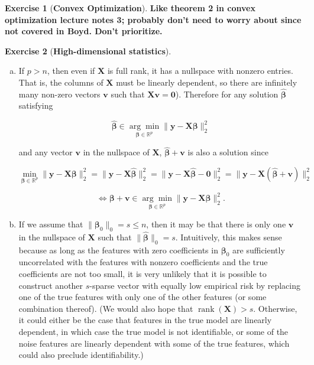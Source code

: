 \documentclass{article}
\theoremstyle{definition}
\newtheorem{exercise}{Exercise}
\theoremstyle{definition}
\theoremstyle{definition}
\theoremstyle{definition}
\begin{document}
\begin{exercise}[\textbf{Convex Optimization}]

\textbf{Like theorem 2 in convex optimization lecture notes 3; probably don't need to worry about since not covered in Boyd. Don't prioritize.}

\end{exercise}

\begin{exercise}[\textbf{High-dimensional statistics}]

\begin{enumerate}[(a)]

\item If \(p > n\), then even if \(\boldsymbol{X}\) is full rank, it has a nullspace with nonzero entries. That is, the columns of \(\boldsymbol{X}\) must be linearly dependent, so there are infinitely many non-zero vectors \(\boldsymbol{v}\) such that \(\boldsymbol{X}\boldsymbol{v} = \boldsymbol{0}\)). Therefore for any solution \(\hat{\boldsymbol{\beta}}\) satisfying 

\[
\hat{\boldsymbol{\beta}} \in \underset{\boldsymbol{\beta} \in \mathbb{R}^p}{\arg \min} \lVert \boldsymbol{y} - \boldsymbol{X} \boldsymbol{\beta} \rVert_2^2 
\]

and any vector \(\boldsymbol{v}\) in the nullspace of \(\boldsymbol{X}\), \(\hat{\boldsymbol{\beta}} + \boldsymbol{v}\) is also a solution since

\[
 \underset{\boldsymbol{\beta} \in \mathbb{R}^p}{\min} \lVert \boldsymbol{y} - \boldsymbol{X} \boldsymbol{\beta} \rVert_2^2 =  \lVert \boldsymbol{y} - \boldsymbol{X} \hat{\boldsymbol{\beta}} \rVert_2^2  =  \lVert \boldsymbol{y} - \boldsymbol{X} \hat{\boldsymbol{\beta}} - \boldsymbol{0} \rVert_2^2  =  \lVert \boldsymbol{y} - \boldsymbol{X} (\hat{\boldsymbol{\beta}} + \boldsymbol{v}) \rVert_2^2 
 \]
 
 \[
 \iff \boldsymbol{\beta} + \boldsymbol{v} \in \underset{\boldsymbol{\beta} \in \mathbb{R}^p}{\arg \min} \lVert \boldsymbol{y} - \boldsymbol{X} \boldsymbol{\beta} \rVert_2^2 .
\]

\item If we assume that \( \lVert \boldsymbol{\beta}_0 \rVert_0 = s \leq n\), then it may be that there is only one \(\boldsymbol{v}\) in the nullspace of \(\boldsymbol{X}\) such that \(\lVert \hat{\boldsymbol{\beta}}\rVert_0 = s\). Intuitively, this makes sense because as long as the features with zero coefficients in \(\boldsymbol{\beta}_0\) are sufficiently uncorrelated with the features with nonzero coefficients and the true coefficients are not too small, it is very unlikely that it is possible to construct another \(s\)-sparse vector with equally low empirical risk by replacing one of the true features with only one of the other features (or some combination thereof). (We would also hope that \(\operatorname{rank}(\boldsymbol{X}) > s\). Otherwise, it could either be the case that features in the true model are linearly dependent, in which case the true model is not identifiable, or some of the noise features are linearly dependent with some of the true features, which could also preclude identifiability.)


\end{enumerate}
\end{exercise}
\end{document}
